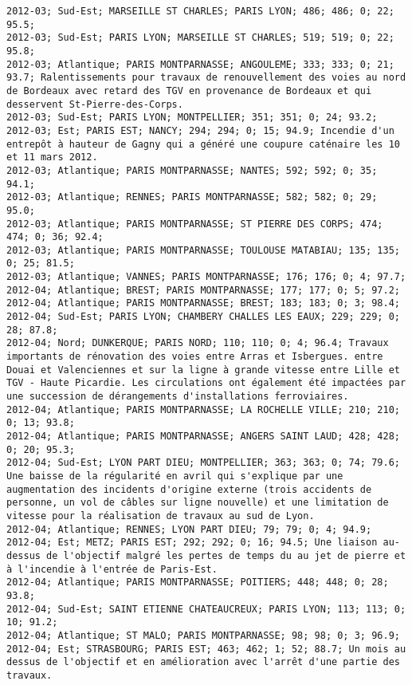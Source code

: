 \documentclass{article}
\begin{document}
\begin{Verbatim}[commandchars=\\\{\}]
2012-03; Sud-Est; MARSEILLE ST CHARLES; PARIS LYON; 486; 486; 0; 22; 95.5; 
2012-03; Sud-Est; PARIS LYON; MARSEILLE ST CHARLES; 519; 519; 0; 22; 95.8; 
2012-03; Atlantique; PARIS MONTPARNASSE; ANGOULEME; 333; 333; 0; 21; 93.7; Ralentissements pour travaux de renouvellement des voies au nord de Bordeaux avec retard des TGV en provenance de Bordeaux et qui desservent St-Pierre-des-Corps.
2012-03; Sud-Est; PARIS LYON; MONTPELLIER; 351; 351; 0; 24; 93.2; 
2012-03; Est; PARIS EST; NANCY; 294; 294; 0; 15; 94.9; Incendie d'un entrepôt à hauteur de Gagny qui a généré une coupure caténaire les 10 et 11 mars 2012.
2012-03; Atlantique; PARIS MONTPARNASSE; NANTES; 592; 592; 0; 35; 94.1; 
2012-03; Atlantique; RENNES; PARIS MONTPARNASSE; 582; 582; 0; 29; 95.0; 
2012-03; Atlantique; PARIS MONTPARNASSE; ST PIERRE DES CORPS; 474; 474; 0; 36; 92.4; 
2012-03; Atlantique; PARIS MONTPARNASSE; TOULOUSE MATABIAU; 135; 135; 0; 25; 81.5; 
2012-03; Atlantique; VANNES; PARIS MONTPARNASSE; 176; 176; 0; 4; 97.7; 
2012-04; Atlantique; BREST; PARIS MONTPARNASSE; 177; 177; 0; 5; 97.2; 
2012-04; Atlantique; PARIS MONTPARNASSE; BREST; 183; 183; 0; 3; 98.4; 
2012-04; Sud-Est; PARIS LYON; CHAMBERY CHALLES LES EAUX; 229; 229; 0; 28; 87.8; 
2012-04; Nord; DUNKERQUE; PARIS NORD; 110; 110; 0; 4; 96.4; Travaux importants de rénovation des voies entre Arras et Isbergues. entre Douai et Valenciennes et sur la ligne à grande vitesse entre Lille et TGV - Haute Picardie. Les circulations ont également été impactées par une succession de dérangements d'installations ferroviaires.
2012-04; Atlantique; PARIS MONTPARNASSE; LA ROCHELLE VILLE; 210; 210; 0; 13; 93.8; 
2012-04; Atlantique; PARIS MONTPARNASSE; ANGERS SAINT LAUD; 428; 428; 0; 20; 95.3; 
2012-04; Sud-Est; LYON PART DIEU; MONTPELLIER; 363; 363; 0; 74; 79.6; Une baisse de la régularité en avril qui s'explique par une augmentation des incidents d'origine externe (trois accidents de personne, un vol de câbles sur ligne nouvelle) et une limitation de vitesse pour la réalisation de travaux au sud de Lyon.
2012-04; Atlantique; RENNES; LYON PART DIEU; 79; 79; 0; 4; 94.9; 
2012-04; Est; METZ; PARIS EST; 292; 292; 0; 16; 94.5; Une liaison au-dessus de l'objectif malgré les pertes de temps du au jet de pierre et à l'incendie à l'entrée de Paris-Est.
2012-04; Atlantique; PARIS MONTPARNASSE; POITIERS; 448; 448; 0; 28; 93.8; 
2012-04; Sud-Est; SAINT ETIENNE CHATEAUCREUX; PARIS LYON; 113; 113; 0; 10; 91.2; 
2012-04; Atlantique; ST MALO; PARIS MONTPARNASSE; 98; 98; 0; 3; 96.9; 
2012-04; Est; STRASBOURG; PARIS EST; 463; 462; 1; 52; 88.7; Un mois au dessus de l'objectif et en amélioration avec l'arrêt d'une partie des travaux.

\end{Verbatim}
\end{document}
